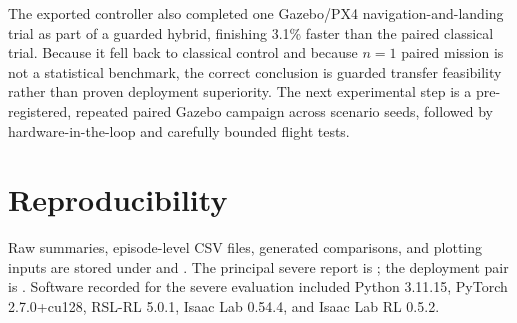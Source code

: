 \documentclass[10pt,twocolumn]{article}
\begin{document}
The exported controller also completed one Gazebo/PX4 navigation-and-landing trial as part of a guarded hybrid, finishing 3.1\% faster than the paired classical trial. Because it fell back to classical control and because $n=1$ paired mission is not a statistical benchmark, the correct conclusion is guarded transfer feasibility rather than proven deployment superiority. The next experimental step is a pre-registered, repeated paired Gazebo campaign across scenario seeds, followed by hardware-in-the-loop and carefully bounded flight tests.

\section*{Reproducibility}
Raw summaries, episode-level CSV files, generated comparisons, and plotting inputs are stored under  and . The principal severe report is ; the deployment pair is . Software recorded for the severe evaluation included Python 3.11.15, PyTorch 2.7.0+cu128, RSL-RL 5.0.1, Isaac Lab 0.54.4, and Isaac Lab RL 0.5.2.
\end{document}
